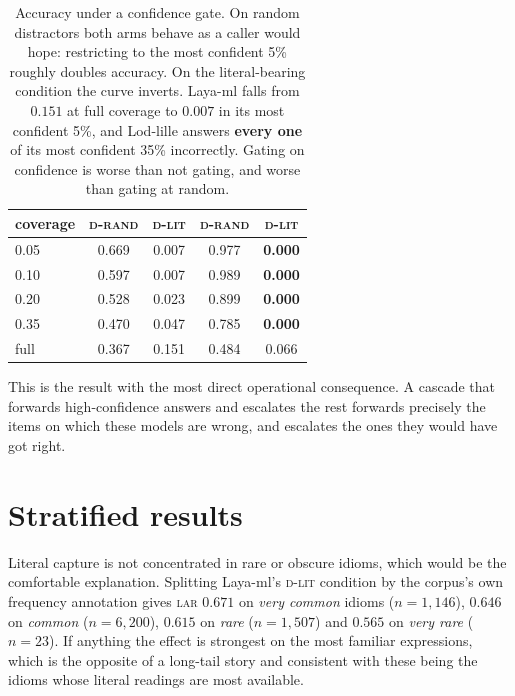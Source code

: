 \documentclass[11pt]{article}
\newcommand{\laya}[1]{\cellcolor{fLaya}#1}
\newcommand{\lod}[1]{\cellcolor{fLod}#1}
\newcommand{\lodh}[1]{\cellcolor{cLod!42}\textbf{#1}}
\newcommand{\Drand}{\textsc{d-rand}}
\newcommand{\Dlit}{\textsc{d-lit}}
\newcommand{\LAR}{\textsc{lar}}
\begin{document}
\begin{table}[h]
\centering\small
\setlength{\tabcolsep}{3.5pt}
\begin{tabular}{lcccc}
\toprule
\textbf{coverage} & \laya{\Drand} & \laya{\Dlit} & \lod{\Drand} & \lod{\Dlit} \\
\midrule
0.05 & \laya{0.669} & \laya{0.007} & \lod{0.977} & \lodh{0.000} \\
0.10 & \laya{0.597} & \laya{0.007} & \lod{0.989} & \lodh{0.000} \\
0.20 & \laya{0.528} & \laya{0.023} & \lod{0.899} & \lodh{0.000} \\
0.35 & \laya{0.470} & \laya{0.047} & \lod{0.785} & \lodh{0.000} \\
\midrule
full & \laya{0.367} & \laya{0.151} & \lod{0.484} & \lod{0.066} \\
\bottomrule
\end{tabular}
\caption{Accuracy under a confidence gate. On random distractors both arms
behave as a caller would hope: restricting to the most confident 5\% roughly
doubles accuracy. On the literal-bearing condition the curve inverts. Laya-ml
falls from $0.151$ at full coverage to $0.007$ in its most confident 5\%, and
Lod-lille answers \textbf{every one} of its most confident 35\% incorrectly.
Gating on confidence is worse than not gating, and worse than gating at random.}
\label{tab:riskcov}
\end{table}

This is the result with the most direct operational consequence. A cascade that
forwards high-confidence answers and escalates the rest
\citep{li2026jevjudge,ibrahim2026evaluating} forwards precisely the items on
which these models are wrong, and escalates the ones they would have got right.

\section{Stratified results}
\label{app:strata}

Literal capture is not concentrated in rare or obscure idioms, which would be
the comfortable explanation. Splitting Laya-ml's \Dlit{} condition by the
corpus's own frequency annotation gives \LAR{} $0.671$ on \emph{very common}
idioms ($n = 1{,}146$), $0.646$ on \emph{common} ($n = 6{,}200$), $0.615$ on
\emph{rare} ($n = 1{,}507$) and $0.565$ on \emph{very rare} ($n = 23$). If
anything the effect is strongest on the most familiar expressions, which is the
opposite of a long-tail story and consistent with these being the idioms whose
literal readings are most available.
\end{document}
